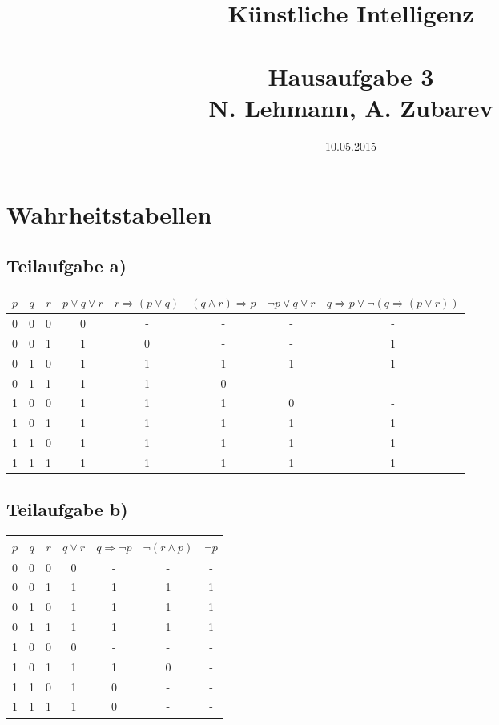 \documentclass{article}
\title{Künstliche Intelligenz\\~\\Hausaufgabe 3\\ \small{N. Lehmann, A. Zubarev}}
\date{10.05.2015}
\begin{document}
\maketitle

\section{Wahrheitstabellen}

\subsection{Teilaufgabe a)}

\begin{tabular}{|c|c|c|c|c|c|c|c|}
\hline
$p$ & $q$ & $r$ & $p \vee q \vee r$ & $r \Rightarrow (p \vee q)$ & $(q \wedge r) \Rightarrow p$ & $\neg p \vee q \vee r$ & $q \Rightarrow p \vee \neg (q \Rightarrow (p \vee r))$\\
\hline
0 & 0 & 0 & 0 & - & - & - & -\\
0 & 0 & 1 & 1 & 0 & - & - & 1\\
0 & 1 & 0 & 1 & 1 & 1 & 1 & 1\\
0 & 1 & 1 & 1 & 1 & 0 & - & -\\
1 & 0 & 0 & 1 & 1 & 1 & 0 & -\\
1 & 0 & 1 & 1 & 1 & 1 & 1 & 1\\
1 & 1 & 0 & 1 & 1 & 1 & 1 & 1\\
1 & 1 & 1 & 1 & 1 & 1 & 1 & 1\\
\hline
\end{tabular}

\subsection{Teilaufgabe b)}

\begin{tabular}{|c|c|c|c|c|c|c|}
\hline
$p$ & $q$ & $r$ & $q \vee r$ & $q \Rightarrow \neg p$ & $\neg (r \wedge p)$ & $\neg p$\\
\hline
0 & 0 & 0 & 0 & - & - & - \\
0 & 0 & 1 & 1 & 1 & 1 & 1 \\
0 & 1 & 0 & 1 & 1 & 1 & 1 \\
0 & 1 & 1 & 1 & 1 & 1 & 1 \\
1 & 0 & 0 & 0 & - & - & - \\
1 & 0 & 1 & 1 & 1 & 0 & - \\
1 & 1 & 0 & 1 & 0 & - & - \\
1 & 1 & 1 & 1 & 0 & - & - \\
\hline
\end{tabular}
\end{document}
